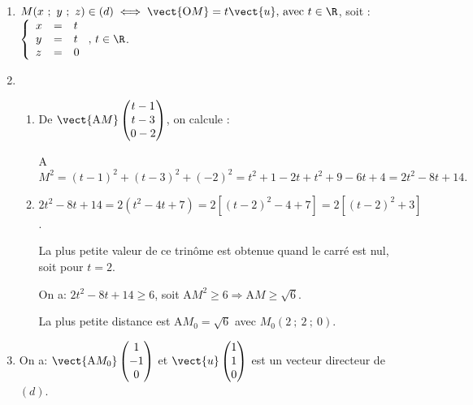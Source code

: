  \begin{enumerate}
\item %
$M(x~;~y~;~z) \in (d) \iff \vect{\text{O}M} = t\vect{u}, \, \text{avec } t \in \R$, soit :
$\left\{\begin{array}{l c l}
x&=&t\\
y&=&t\\
z&=&0
\end{array}\right., \, t \in \R$.

\item %
\begin{enumerate}
\item  %
De $\vect{\text{A}M}\begin{pmatrix}t - 1\\t - 3\\0 - 2\end{pmatrix}$, on calcule :

A$M^2 = (t - 1)^2 + (t - 3)^2 + (- 2)^2 = t^2 + 1 - 2t + t^2 + 9 - 6t + 4 = 2t^2 - 8t+ 14.$

\item %

$2t^2 - 8t+ 14 = 2\left(t^2 - 4t + 7\right) = 2\left[(t - 2)^2 -  4 + 7 \right] = 2\left[(t - 2)^2 + 3\right]$.

La plus petite valeur de ce trinôme est obtenue quand le carré est nul, soit pour $t = 2$.

On a: $2t^2 - 8t+ 14 \geqslant 6$, soit $\text{A}M^2 \geqslant 6 \Rightarrow \text{A}M \geqslant \sqrt{6}$.

La plus petite distance est A$M_0 = \sqrt{6}$ avec $M_0(2~;~2~;~0)$.
\end{enumerate}
\item %
On a: $\vect{\text{A}M_0}\begin{pmatrix}1\\- 1\\0\end{pmatrix}$ et $\vect{u}\begin{pmatrix}1\\ 1\\0\end{pmatrix}$ est un vecteur directeur de $(d)$.


\end{enumerate}
